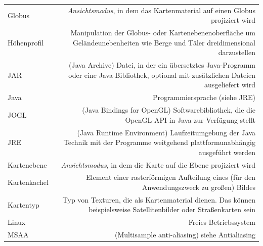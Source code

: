 \documentclass[10pt]{scrreprt}
\newcommand{\textref}[1]{\mbox{\raisebox{0.1ex}{\small$\rightarrow$ }\textit{#1}}}
\begin{document}
\begin{longtabu}{L{0.35} R{1.65}}
Globus  & \textref{Ansichtsmodus}, in dem das Kartenmaterial auf einen Globus projiziert wird\\
Höhenprofil  & Manipulation der Globus- oder Kartenebenenoberfläche um Geländeunebenheiten wie Berge und Täler dreidimensional darzustellen\\
JAR  & (Java Archive) Datei, in der ein übersetztes Java-Programm oder eine Java-Bibliothek, optional mit zusätzlichen Dateien ausgeliefert wird\\
Java  & Programmiersprache (siehe JRE)\\
JOGL  & (Java Bindings for OpenGL) Softwarebibliothek, die die OpenGL-API in Java zur Verfügung stellt\\
JRE  & (Java Runtime Environment) Laufzeitumgebung der Java Technik mit der Programme weitgehend plattformunabhängig ausgeführt werden\\
Kartenebene  & \textref{Ansichtsmodus}, in dem die Karte auf die Ebene projiziert wird\\

Kartenkachel  & Element einer rasterförmigen Aufteilung eines (für den Anwendungszweck zu großen) Bildes\\
Kartentyp & Typ von Texturen, die als Kartenmaterial dienen. Das können beispielsweise Satellitenbilder oder Straßenkarten sein\\
Linux & Freies Betriebssystem\\
MSAA   & (Multisample anti-aliasing) siehe Antialiasing\\


\end{longtabu}
\end{document}
